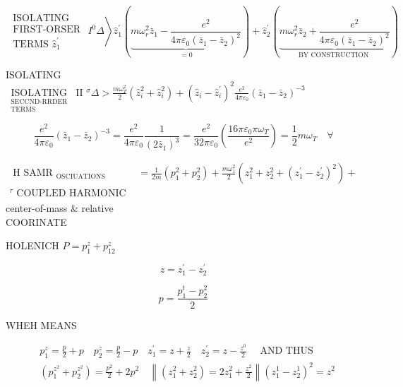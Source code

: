 \documentclass[10pt]{article}
\begin{document}
$$
\left.\begin{array}{c}
\text { ISOLATING } \\
\text { FIRST-ORSER } \\
\text { TERMS } \hat{z}_{1}^{\prime}
\end{array} I^{0} \Delta\right\rangle \hat{z}_{1}^{\prime}(\underbrace{m \omega_{r}^{2} \bar{z}_{1}-\frac{e^{2}}{4 \pi \varepsilon_{0}\left(\bar{z}_{1}-\bar{z}_{2}\right)^{2}}}_{=0})+\hat{z}_{2}^{\prime}(\underbrace{m \omega_{r}^{2} \bar{z}_{2}+\frac{e^{2}}{4 \pi \varepsilon_{0}\left(\bar{z}_{1}-\bar{z}_{2}\right)^{2}}}_{\text {BY CONSTRUCTION }})
$$

ISOLATING\\
$\underset{\substack{\text { SECCND-RRDER } \\ \text { TERMS }}}{\text { ISOLATING }}$ II $^{\sigma} \Delta>\frac{m \omega_{T}^{2}}{2}\left(\hat{z}_{i}^{2}+\hat{z}_{i}^{2}\right)+\left(\hat{z}_{i}-\hat{z}_{i}^{\prime}\right)^{2} \frac{e^{2}}{4 \pi \varepsilon_{0}}\left(\bar{z}_{1}-\bar{z}_{2}\right)^{-3}$

$$
\frac{e^{2}}{4 \pi \varepsilon_{0}}\left(\bar{z}_{1}-\bar{z}_{2}\right)^{-3}=\frac{e^{2}}{4 \pi \varepsilon_{0}} \frac{1}{\left(2 \bar{z}_{1}\right)^{3}}=\frac{e^{2}}{32 \pi \varepsilon_{0}}\left(\frac{16 \pi \varepsilon_{0} \pi \omega_{T}}{e^{2}}\right)=\frac{1}{2} m \omega_{T} \quad \forall
$$

$\begin{aligned} \text { H SAMR }_{\text {OSCIUATIONS }} & =\frac{1}{2 m}\left(p_{1}^{2}+p_{2}^{2}\right)+\frac{m \omega_{1}^{2}}{2}\left(z_{1}^{2}+z_{2}^{2}+\left(z_{1}^{\prime}-z_{2}^{\prime}\right)^{2}\right)+ \\ { }^{\tau} \text { COUPLED HARMONIC OSCILATORS (YEAM, NO BIG SURARISE) } & \end{aligned}$\\
center-of-mass \& relative\\
COORINATE

HOLENICH $P=p_{1}^{z}+p_{12}^{z}$

$$
z=z_{1}^{\prime}-z_{2}^{\prime}
$$

$$
p=\frac{p_{1}^{t}-p_{2}^{2}}{2}
$$

WHEH MEANS

$$
\begin{aligned}
& p_{1}^{z}=\frac{p}{2}+p \quad p_{2}^{z}=\frac{p}{2}-p \quad z_{1}^{\prime}=z+\frac{z}{2} \quad z_{2}^{\prime}=z-\frac{z^{0}}{2} \quad \text { AND THUS } \\
& \left(p_{1}^{z^{2}}+p_{2}^{z^{2}}\right)=\frac{p^{2}}{2}+2 p^{2} \quad\left\|\left(z_{1}^{2}+z_{2}^{2}\right)=2 z_{1}^{2}+\frac{z^{2}}{2}\right\|\left(z_{1}^{1}-z_{2}^{1}\right)^{2}=z^{2}
\end{aligned}
$$
\end{document}
